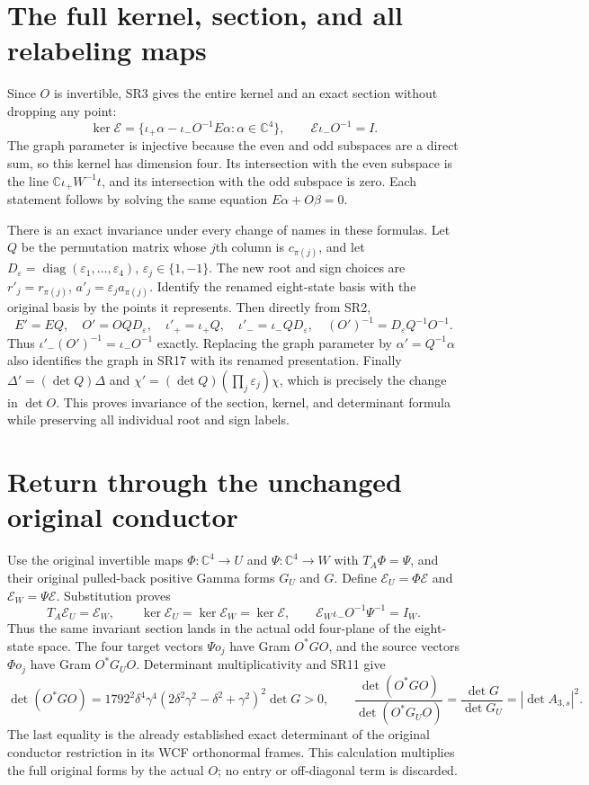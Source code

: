 \documentclass[11pt]{article}
\newcommand{\C}{\mathbb C}
\newcommand{\diag}{\operatorname{diag}}
\begin{document}
\section{The full kernel, section, and all relabeling maps}
Since $O$ is invertible, SR3 gives the entire kernel and an exact
section without dropping any point:
\[
 \ker\mathcal E
 =\{\iota_+\alpha-\iota_-O^{-1}E\alpha:\alpha\in\C^4\},
 \qquad \mathcal E\iota_-O^{-1}=I.
 \tag{SR17}
\]
The graph parameter is injective because the even and odd
subspaces are a direct sum, so this kernel has dimension four.
Its intersection with the even subspace is the line
$\C\iota_+W^{-1}t$, and its intersection with the odd subspace
is zero. Each statement follows by solving the same equation
$E\alpha+O\beta=0$.

There is an exact invariance under every change of names in
these formulas. Let $Q$ be the permutation matrix whose $j$th
column is $c_{\pi(j)}$, and let
$D_\varepsilon=\diag(\varepsilon_1,\ldots,\varepsilon_4)$,
$\varepsilon_j\in\{1,-1\}$. The new root and sign choices are
$r'_j=r_{\pi(j)}$, $a'_j=\varepsilon_j a_{\pi(j)}$.
Identify the renamed eight-state basis with the original basis
by the points it represents. Then directly from SR2,
\[
 E'=EQ,\quad O'=OQD_\varepsilon,\quad
 \iota'_+=\iota_+Q,\quad\iota'_-=\iota_-QD_\varepsilon,
 \quad (O')^{-1}=D_\varepsilon Q^{-1}O^{-1}.
 \tag{SR18}
\]
Thus
$\iota'_-(O')^{-1}=\iota_-O^{-1}$ exactly. Replacing the
graph parameter by $\alpha'=Q^{-1}\alpha$ also identifies
the graph in SR17 with its renamed presentation. Finally
$\Delta'=(\det Q)\Delta$ and
$\chi'=(\det Q)(\prod_j\varepsilon_j)\chi$, which is
precisely the change in $\det O$. This proves invariance of
the section, kernel, and determinant formula while preserving
all individual root and sign labels.

\section{Return through the unchanged original conductor}
Use the original invertible maps $\Phi:\C^4\to U$ and
$\Psi:\C^4\to W$ with $T_A\Phi=\Psi$, and their original
pulled-back positive Gamma forms $G_U$ and $G$. Define
$\mathcal E_U=\Phi\mathcal E$ and
$\mathcal E_W=\Psi\mathcal E$. Substitution proves
\[
 T_A\mathcal E_U=\mathcal E_W,\qquad
 \ker\mathcal E_U=\ker\mathcal E_W=\ker\mathcal E,
 \qquad
 \mathcal E_W\iota_-O^{-1}\Psi^{-1}=I_W.
 \tag{SR19}
\]
Thus the same invariant section lands in the actual odd
four-plane of the eight-state space. The four target vectors
$\Psi o_j$ have Gram $O^*GO$, and the source vectors $\Phi o_j$
have Gram $O^*G_UO$. Determinant multiplicativity and SR11 give
\[
 \det(O^*GO)=1792^2\delta^4\gamma^4
 (2\delta^2\gamma^2-\delta^2+\gamma^2)^2\det G>0,
 \qquad
 \frac{\det(O^*GO)}{\det(O^*G_UO)}
 =\frac{\det G}{\det G_U}=|\det A_{3,s}|^2.
 \tag{SR20}
\]
The last equality is the already established exact determinant
of the original conductor restriction in its WCF orthonormal
frames. This calculation multiplies the full original forms
by the actual $O$; no entry or off-diagonal term is discarded.
\end{document}
